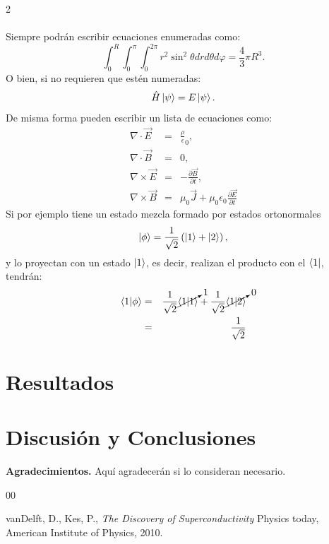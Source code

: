 \documentclass[10pt]{article}
\begin{document}
\begin{multicols}{2}
		\lipsum[2]\\
		\\
		Siempre podrán escribir ecuaciones enumeradas como:
		\begin{equation}
		    \int_{0}^{R}\int_{0}^{\pi}\int_{0}^{2\pi}r^{2}\sin^{2}\theta drd\theta d\varphi=\frac{4}{3}\pi R^{3}.
		\end{equation}
		O bien, si no requieren que estén numeradas:
		\begin{equation*}
		    \hat{H}\ket{\psi}=E\ket{\psi}.
		\end{equation*}
		De misma forma pueden escribir un lista de ecuaciones como:
		\begin{eqnarray*}
	        \nabla\cdot\vec{E}&=&\frac{\rho}{\epsilon}_{0},\\
	        \nabla\cdot\vec{B}&=&0,\\
	        \nabla\times\vec{E}&=&-\frac{\partial \vec{B}}{\partial t},\\
	        \nabla\times\vec{B}&=&\mu_{0}\vec{J}+\mu_{0}\epsilon_{0}\frac{\partial \vec{E}}{\partial t}
		\end{eqnarray*}
		Si por ejemplo tiene un estado mezcla formado por estados ortonormales
		\begin{equation*}
		    \ket{\phi}=\frac{1}{\sqrt{2}}\left(\ket{1}+\ket{2}\right),
		\end{equation*}
		y lo proyectan con un estado $\ket{1}$, es decir, realizan el producto con el $\bra{1}$, tendrán:
		\begin{eqnarray}
		    \braket{1|\phi}&=&\frac{1}{\sqrt{2}}\cancelto{1}{\braket{1|1}}+\frac{1}{\sqrt{2}}\cancelto{0}{\braket{1|2}}\nonumber\\&=&\frac{1}{\sqrt{2}}
		\end{eqnarray}
		\section*{Resultados}
			\lipsum
		\section*{Discusión y Conclusiones}
		    \lipsum[2]
    \bigskip

    \textbf{Agradecimientos.} Aquí agradecerán si lo consideran necesario.
    
    \bigskip
    
	    \begin{thebibliography}{00}
	    
	        \newblock vanDelft, D., Kes, P.,
	        \newblock \textit{The Discovery of Superconductivity}
	        \newblock Physics today, American Institute of Physics, 2010.
	    

\end{thebibliography}
\end{multicols}
\end{document}
